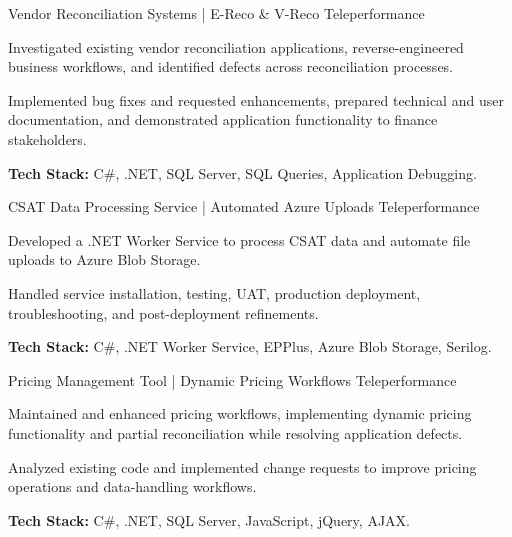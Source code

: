 
\begin{cventries}

  \cventry
    {Vendor Reconciliation Systems \textnormal{| E-Reco \& V-Reco}}
    {Teleperformance}
    {
      \begin{cvitems}
        \item {Investigated existing vendor reconciliation applications, reverse-engineered business workflows, and identified defects across reconciliation processes.}
        \item {Implemented bug fixes and requested enhancements, prepared technical and user documentation, and demonstrated application functionality to finance stakeholders.}
        \item {\textbf{Tech Stack:} C\#, .NET, SQL Server, SQL Queries, Application Debugging.}
      \end{cvitems}
    }

  \cventry
    {CSAT Data Processing Service \textnormal{| Automated Azure Uploads}}
    {Teleperformance}
    {
      \begin{cvitems}
        \item {Developed a .NET Worker Service to process CSAT data and automate file uploads to Azure Blob Storage.}
        \item {Handled service installation, testing, UAT, production deployment, troubleshooting, and post-deployment refinements.}
        \item {\textbf{Tech Stack:} C\#, .NET Worker Service, EPPlus, Azure Blob Storage, Serilog.}
      \end{cvitems}
    }

  \cventry
    {Pricing Management Tool \textnormal{| Dynamic Pricing Workflows}}
    {Teleperformance}
    {
      \begin{cvitems}
        \item {Maintained and enhanced pricing workflows, implementing dynamic pricing functionality and partial reconciliation while resolving application defects.}
        \item {Analyzed existing code and implemented change requests to improve pricing operations and data-handling workflows.}
        \item {\textbf{Tech Stack:} C\#, .NET, SQL Server, JavaScript, jQuery, AJAX.}
      \end{cvitems}
    }


\end{cventries}
